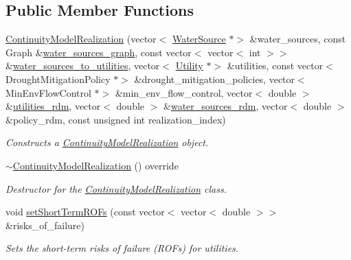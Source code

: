 \subsection*{Public Member Functions}
\begin{DoxyCompactItemize}
\item 
\mbox{\hyperlink{classContinuityModelRealization_a641c096ac73586597b3e21a5d516c923}{Continuity\+Model\+Realization}} (vector$<$ \mbox{\hyperlink{classWaterSource}{Water\+Source}} $\ast$$>$ \&water\+\_\+sources, const Graph \&\mbox{\hyperlink{classContinuityModel_a563401588c6fa622f03393909a3522db}{water\+\_\+sources\+\_\+graph}}, const vector$<$ vector$<$ int $>$$>$ \&\mbox{\hyperlink{classContinuityModel_ae8516bcbbf52650190277fc8b06c1843}{water\+\_\+sources\+\_\+to\+\_\+utilities}}, vector$<$ \mbox{\hyperlink{classUtility}{Utility}} $\ast$$>$ \&utilities, const vector$<$ Drought\+Mitigation\+Policy $\ast$$>$ \&drought\+\_\+mitigation\+\_\+policies, vector$<$ Min\+Env\+Flow\+Control $\ast$$>$ \&min\+\_\+env\+\_\+flow\+\_\+control, vector$<$ double $>$ \&\mbox{\hyperlink{classContinuityModel_aa4a00b76da6295d2faa11e3dcaea1896}{utilities\+\_\+rdm}}, vector$<$ double $>$ \&\mbox{\hyperlink{classContinuityModel_ab7b8fa93a6f56b328e425e1ead6cfefa}{water\+\_\+sources\+\_\+rdm}}, vector$<$ double $>$ \&policy\+\_\+rdm, const unsigned int realization\+\_\+index)
\begin{DoxyCompactList}\small\item\em Constructs a \mbox{\hyperlink{classContinuityModelRealization}{Continuity\+Model\+Realization}} object. \end{DoxyCompactList}\item 
\mbox{\hyperlink{classContinuityModelRealization_afd53069e2f9ab96210ff153d16f01269}{$\sim$\+Continuity\+Model\+Realization}} () override
\begin{DoxyCompactList}\small\item\em Destructor for the \mbox{\hyperlink{classContinuityModelRealization}{Continuity\+Model\+Realization}} class. \end{DoxyCompactList}\item 
void \mbox{\hyperlink{classContinuityModelRealization_ae2c40328beb671fa9b10ecc2921b8375}{set\+Short\+Term\+R\+O\+Fs}} (const vector$<$ vector$<$ double $>$$>$ \&risks\+\_\+of\+\_\+failure)
\begin{DoxyCompactList}\small\item\em Sets the short-\/term risks of failure (R\+O\+Fs) for utilities. \end{DoxyCompactList}\item 

\end{DoxyCompactItemize}
